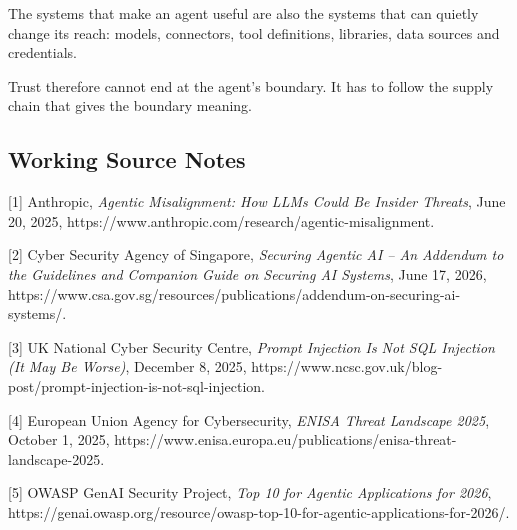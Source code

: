 The systems that make an agent useful are also the systems that can
quietly change its reach: models, connectors, tool definitions,
libraries, data sources and credentials.

Trust therefore cannot end at the agent's boundary. It has to follow the
supply chain that gives the boundary meaning.

\subsection{Working Source Notes}\label{working-source-notes}

{[}1{]} Anthropic, \emph{Agentic Misalignment: How LLMs Could Be Insider
Threats}, June 20, 2025,
https://www.anthropic.com/research/agentic-misalignment.

{[}2{]} Cyber Security Agency of Singapore, \emph{Securing Agentic AI --
An Addendum to the Guidelines and Companion Guide on Securing AI
Systems}, June 17, 2026,
https://www.csa.gov.sg/resources/publications/addendum-on-securing-ai-systems/.

{[}3{]} UK National Cyber Security Centre, \emph{Prompt Injection Is Not
SQL Injection (It May Be Worse)}, December 8, 2025,
https://www.ncsc.gov.uk/blog-post/prompt-injection-is-not-sql-injection.

{[}4{]} European Union Agency for Cybersecurity, \emph{ENISA Threat
Landscape 2025}, October 1, 2025,
https://www.enisa.europa.eu/publications/enisa-threat-landscape-2025.

{[}5{]} OWASP GenAI Security Project, \emph{Top 10 for Agentic
Applications for 2026},
https://genai.owasp.org/resource/owasp-top-10-for-agentic-applications-for-2026/.
